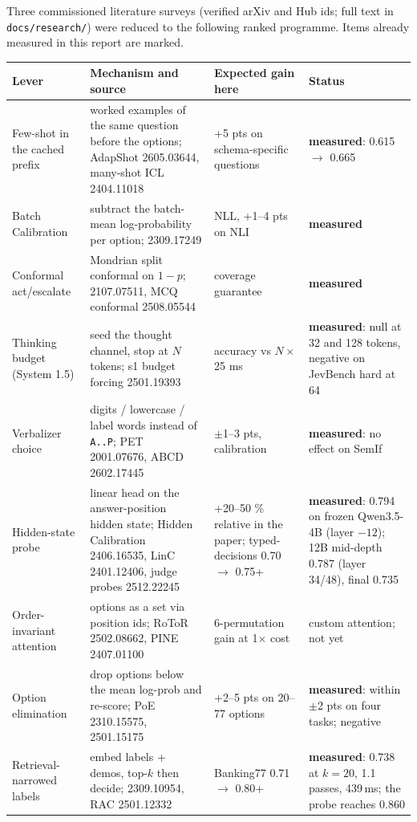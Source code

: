 \documentclass[11pt,a4paper]{article}
\newcommand{\code}[1]{\texttt{#1}}
\begin{document}
Three commissioned literature surveys (verified arXiv and Hub ids; full text in \code{docs/research/}) were reduced to the following ranked programme. Items already measured in this report are marked.

\begin{table}[H]
\centering\small
\begin{tabularx}{\textwidth}{L{34mm} X L{30mm} L{26mm}}
\toprule
Lever & Mechanism and source & Expected gain here & Status \\
\midrule
Few-shot in the cached prefix & worked examples of the same question before the options; AdapShot 2605.03644, many-shot ICL 2404.11018 & +5 pts on schema-specific questions & \textbf{measured}: 0.615 $\to$ 0.665 \\
Batch Calibration & subtract the batch-mean log-probability per option; 2309.17249 & NLL, +1--4 pts on NLI & \textbf{measured} \\
Conformal act/escalate & Mondrian split conformal on $1-p$; 2107.07511, MCQ conformal 2508.05544 & coverage guarantee & \textbf{measured} \\
Thinking budget (System 1.5) & seed the thought channel, stop at $N$ tokens; s1 budget forcing 2501.19393 & accuracy vs $N\times$25 ms & \textbf{measured}: null at 32 and 128 tokens, negative on JevBench hard at 64 \\
Verbalizer choice & digits / lowercase / label words instead of \code{A..P}; PET 2001.07676, ABCD 2602.17445 & $\pm$1--3 pts, calibration & \textbf{measured}: no effect on SemIf \\
Hidden-state probe & linear head on the answer-position hidden state; Hidden Calibration 2406.16535, LinC 2401.12406, judge probes 2512.22245 & +20--50 \% relative in the paper; typed-decisions 0.70 $\to$ 0.75+ & \textbf{measured}: 0.794 on frozen Qwen3.5-4B (layer $-12$); 12B mid-depth 0.787 (layer 34/48), final 0.735 \\
Order-invariant attention & options as a set via position ids; RoToR 2502.08662, PINE 2407.01100 & 6-permutation gain at 1$\times$ cost & custom attention; not yet \\
Option elimination & drop options below the mean log-prob and re-score; PoE 2310.15575, 2501.15175 & +2--5 pts on 20--77 options & \textbf{measured}: within $\pm$2 pts on four tasks; negative \\
Retrieval-narrowed labels & embed labels + demos, top-$k$ then decide; 2309.10954, RAC 2501.12332 & Banking77 0.71 $\to$ 0.80+ & \textbf{measured}: 0.738 at $k{=}20$, 1.1 passes, 439\,ms; the probe reaches 0.860 \\

\end{tabularx}
\end{table}
\end{document}
